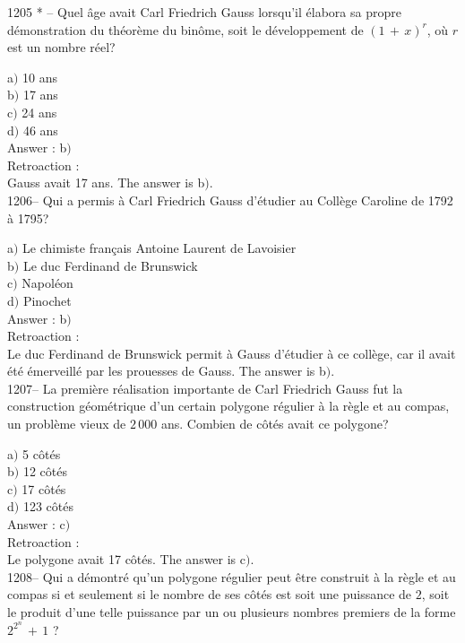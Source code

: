 ﻿\documentclass[letterpaper, 12pt]{article}
\begin{document}
1205 * -- Quel \^age avait Carl Friedrich Gauss lorsqu'il \'elabora
sa propre d\'emonstration du th\'eor\`eme du bin\^ome, soit le
d\'eveloppement de $(1\,+\,x)^r$, o\`u $r$ est un nombre r\'eel?

a$)$ 10 ans \\
b$)$ 17 ans \\
c$)$ 24 ans \\
d$)$ 46 ans\\

Answer : b$)$\\

Retroaction : \\
Gauss avait 17 ans.
The answer is b$)$.\\

1206-- Qui a permis \`a Carl Friedrich Gauss d'\'etudier au
Coll\`ege Caroline de 1792 \`a 1795?

a$)$ Le chimiste fran\c cais Antoine Laurent de Lavoisier \\
b$)$ Le duc Ferdinand de Brunswick \\
c$)$ Napol\'eon \\
d$)$ Pinochet\\

Answer : b$)$\\

Retroaction : \\
Le duc Ferdinand de Brunswick permit \`a Gauss d'\'etudier \`a ce
coll\`ege, car il avait \'et\'e \'emerveill\'e par les prouesses de
Gauss.
The answer is b$)$.\\

1207-- La premi\`ere r\'ealisation importante de Carl Friedrich
Gauss fut la construction g\'eom\'etrique d'un certain polygone
r\'egulier \`a la r\`egle et au compas, un probl\`eme vieux de
$2\,000$ ans. Combien de c\^ot\'es avait ce polygone?

a$)$ 5 c\^ot\'es\\
b$)$ 12 c\^ot\'es\\
c$)$ 17 c\^ot\'es\\
d$)$ 123 c\^ot\'es\\

Answer : c$)$\\

Retroaction : \\
Le polygone avait 17 c\^ot\'es.
The answer is c$)$.\\

1208-- Qui a d\'emontr\'e qu'un polygone r\'egulier peut \^etre
construit \`a la r\`egle et au compas si et seulement si le nombre
de ses c\^ot\'es est soit une puissance de $2$, soit le produit
d'une telle puissance par un ou plusieurs nombres premiers de la
forme $2^{2^n}\,+\,1$ ?
\end{document}
